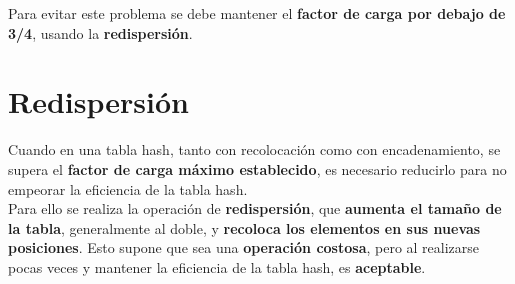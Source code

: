 \documentclass{article}
\begin{document}
Para evitar este problema se debe mantener el \textbf{factor de carga por debajo de 3/4}, usando la \textbf{redispersión}.

\section{Redispersión}
Cuando en una tabla hash, tanto con recolocación como con encadenamiento, se supera el \textbf{factor de carga máximo establecido}, es necesario reducirlo para no empeorar la eficiencia de la tabla hash. \\

Para ello se realiza la operación de \textbf{redispersión}, que \textbf{aumenta el tamaño de la tabla}, generalmente al doble, y \textbf{recoloca los elementos en sus nuevas posiciones}. Esto supone que sea una \textbf{operación costosa}, pero al realizarse pocas veces y mantener la eficiencia de la tabla hash, es \textbf{aceptable}.

\begin{comment}
\begin{figure}[h]
    \centering
    \texttt{[image: Captura\_de\_pantalla\_20241103\_122101.png]}
    \caption{Características de los datos}
\end{figure}
\end{comment}

\begin{comment}
    \begin{wrapfigure}[]{r}{0.45\linewidth}
    \centering
    \texttt{[image: Captura\_de\_pantalla\_20241110\_154938.png]}
    \caption{Características de los datos}
\end{wrapfigure}
\end{comment}
\end{document}

